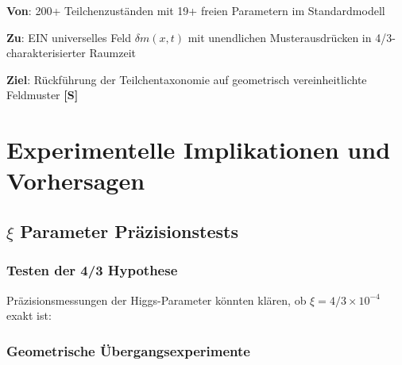 	\begin{tcolorbox}[colback=green!5!white,colframe=green!75!black,title=T0-Vereinheitlichung]
		\textbf{Von}: 200+ Teilchenzuständen mit 19+ freien Parametern im Standardmodell
		
		\textbf{Zu}: EIN universelles Feld $\delta m(x,t)$ mit unendlichen Musterausdrücken in 4/3-charakterisierter Raumzeit
		
		\textbf{Ziel}: Rückführung der Teilchentaxonomie auf geometrisch vereinheitlichte Feldmuster \textbf{[S]}
	\end{tcolorbox}
	
	\section{Experimentelle Implikationen und Vorhersagen}
	\label{sec:experimentelle_implikationen}
	
	\subsection{$\xi$ Parameter Präzisionstests}
	\label{subsec:xi_praezisionstests}
	
	\subsubsection{Testen der 4/3 Hypothese}
	\label{subsubsec:testen_vier_drittel}
	
	Präzisionsmessungen der Higgs-Parameter könnten klären, ob $\xi = 4/3 \times 10^{-4}$ exakt ist:
	
	\begin{table}[htbp]
		\centering
		\caption{Präzisionsanforderungen zum Testen der $\xi = 4/3$ Hypothese}
		\label{tab:praezisionsanforderungen}
	\end{table}
	
	\subsubsection{Geometrische Übergangsexperimente}
	\label{subsubsec:geometrische_uebergaenge}
	
